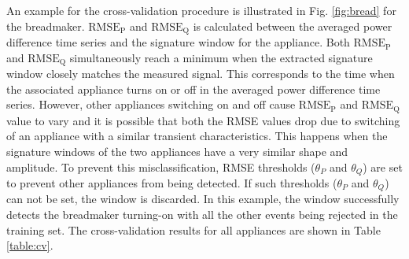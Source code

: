\documentclass[conference]{IEEEtran}
\begin{document}
%
%		
%



An example for the cross-validation procedure is illustrated in Fig. \ref{fig:bread} for the breadmaker.  $\text{RMSE}_{\text{P}}$ and $\text{RMSE}_{\text{Q}}$ is calculated between the averaged power difference time series and the signature window for the appliance. Both $\text{RMSE}_{\text{P}}$ and $\text{RMSE}_{\text{Q}}$ simultaneously reach a minimum when the extracted signature window closely matches the measured signal.  This corresponds to the time when the associated appliance turns on or off in the averaged power difference time series. However, other appliances switching on and off cause $\text{RMSE}_{\text{P}}$ and $\text{RMSE}_{\text{Q}}$ value to vary and it is possible that both the RMSE values drop due to switching of an appliance with a similar transient characteristics.  This happens when the signature windows of the two appliances have a very similar shape and amplitude.  To prevent this misclassification, RMSE thresholds ($\theta_P$ and $\theta_Q$) are set to prevent other appliances from being detected.  If such thresholds ($\theta_P$ and $\theta_Q$) can not be set, the window is discarded.  In this example, the window successfully detects the breadmaker turning-on with all the other events being rejected in the training set.  The cross-validation results for all appliances are shown in Table \ref{table:cv}.  
\end{document}
